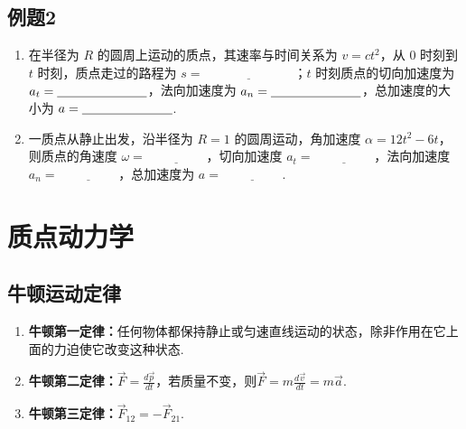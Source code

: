 \newpage
\subsection{例题2}

\begin{enumerate}
	
	\item 在半径为 $R$ 的圆周上运动的质点，其速率与时间关系为 $v = ct^2$，从 $0$ 时刻到 $t$ 时刻，质点走过的路程为 $s = \underline{\hspace{3cm}}$；$t$ 时刻质点的切向加速度为 $a_t = \underline{\hspace{2.5cm}}$，法向加速度为 $a_n = \underline{\hspace{2.5cm}}$，总加速度的大小为 $a = \underline{\hspace{2.5cm}}$.
	
	\item 一质点从静止出发，沿半径为 $R=1$ 的圆周运动，角加速度
	$\alpha = 12t^2 - 6t$，则质点的角速度
	$\omega = \underline{\hspace{2cm}}$，切向加速度
	$a_t = \underline{\hspace{2cm}}$，法向加速度
	$a_n = \underline{\hspace{2cm}}$，总加速度为
	$a = \underline{\hspace{2cm}}$.
	
\end{enumerate}


\newpage
\section{质点动力学}

\subsection{牛顿运动定律}

\begin{enumerate}
	\item \textbf{牛顿第一定律：}任何物体都保持静止或匀速直线运动的状态，除非作用在它上面的力迫使它改变这种状态.
	
	\item \textbf{牛顿第二定律：}$\vec{F}=\frac{d\vec{p}}{dt}$，若质量不变，则$\vec{F}=m\frac{d\vec{v}}{dt}=m\vec{a}$.
	
	\item \textbf{牛顿第三定律：}$\overrightarrow{F}_{12}=-\overrightarrow{F}_{21}$.
\end{enumerate}

